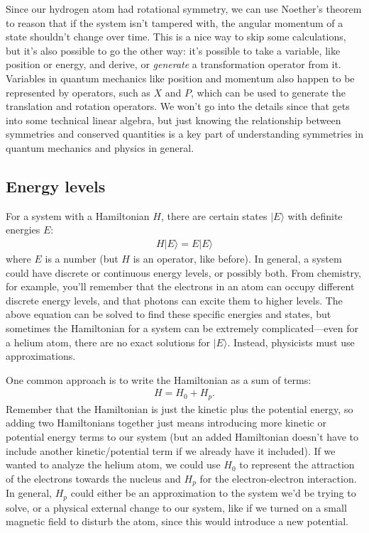 Since our hydrogen atom had rotational symmetry, we can use Noether's theorem to reason that if the system isn't tampered with, the angular momentum of a state shouldn't change over time. This is a nice way to skip some calculations, but it's also possible to go the other way: it's possible to take a variable, like position or energy, and derive, or \emph{generate} a transformation operator from it. Variables in quantum mechanics like position and momentum also happen to be represented by operators, such as $X$ and $P$, which can be used to generate the translation and rotation operators. We won't go into the details since that gets into some technical linear algebra, but just knowing the relationship between symmetries and conserved quantities is a key part of understanding symmetries in quantum mechanics and physics in general.

\subsection*{Energy levels}

For a system with a Hamiltonian $H$, there are certain states $|E\rangle$ with definite energies $E$:
\begin{align*}
    H|E\rangle = E|E\rangle
\end{align*}
where $E$ is a number (but $H$ is an operator, like before). In general, a system could have discrete or continuous energy levels, or possibly both. From chemistry, for example, you'll remember that the electrons in an atom can occupy different discrete energy levels, and that photons can excite them to higher levels. The above equation can be solved to find these specific energies and states, but sometimes the Hamiltonian for a system can be extremely complicated---even for a helium atom, there are no exact solutions for $|E\rangle$. Instead, physicists must use approximations.

One common approach is to write the Hamiltonian as a sum of terms:
\begin{align*}
    H = H_0 + H_p.
\end{align*}
Remember that the Hamiltonian is just the kinetic plus the potential energy, so adding two Hamiltonians together just means introducing more kinetic or potential energy terms to our system (but an added Hamiltonian doesn't have to include another kinetic/potential term if we already have it included). If we wanted to analyze the helium atom, we could use $H_0$ to represent the attraction of the electrons towards the nucleus and $H_p$ for the electron-electron interaction. In general, $H_p$ could either be an approximation to the system we'd be trying to solve, or a physical external change to our system, like if we turned on a small magnetic field to disturb the atom, since this would introduce a new potential.

